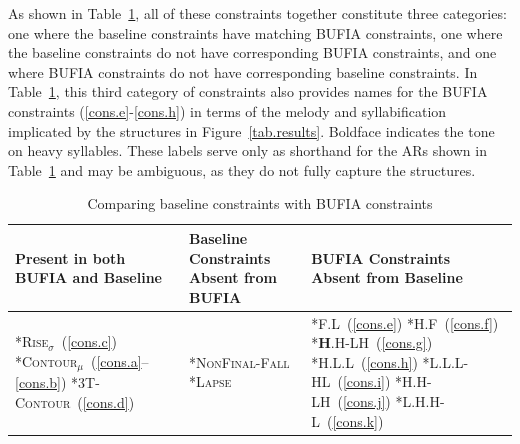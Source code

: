 As shown in Table~\ref{sec5.tab.compare}, all of these
constraints together constitute three categories: one where the
baseline constraints have matching BUFIA constraints, one where the
baseline constraints do not have corresponding BUFIA constraints, and
one where BUFIA constraints do not have corresponding baseline
constraints. In Table~\ref{sec5.tab.compare}, this third category of
constraints also provides names for the BUFIA constraints
(\ref{cons.e}-\ref{cons.h}) in terms of the melody and syllabification
implicated by the structures in Figure~\ref{tab.results}. Boldface 
indicates the tone on heavy syllables. These labels serve only 
as shorthand for the ARs shown in Table~\ref{sec5.tab.compare} and 
may be ambiguous, as they do not fully capture the structures. 

\begin{table}[h!]
	\centering
	\begin{tabular}{p{4cm}p{3.5cm}p{3.5cm}}
		\toprule
		\textbf{Present in both \newline BUFIA and Baseline} 
		& \textbf{Baseline Constraints \newline Absent from BUFIA} 
		& \textbf{BUFIA Constraints \newline Absent from Baseline} \\
		\midrule
		\textsc{*Rise}$_\sigma$~(\ref{cons.c})\newline
		\textsc{*Contour}$_\mu$~(\ref{cons.a}--\ref{cons.b})\newline
		\textsc{*3T-Contour}~(\ref{cons.d})\newline
		& \textsc{*NonFinal-Fall}\newline
		\textsc{*Lapse}
		& \textsc{*F.L}~(\ref{cons.e})\newline
		\textsc{*H.F}~(\ref{cons.f})\newline
		\textsc{*\textbf{H}.H-LH}~(\ref{cons.g})\newline
		\textsc{*H.L.L}~(\ref{cons.h})\newline
		\textsc{*L.L.L-HL}~(\ref{cons.i})\newline
		\textsc{*H.H-LH}~(\ref{cons.j})\newline
		\textsc{*L.H.H-L}~(\ref{cons.k})\\
		\bottomrule
	\end{tabular}
	\caption{Comparing baseline constraints with BUFIA constraints}
	\label{sec5.tab.compare}
\end{table}

